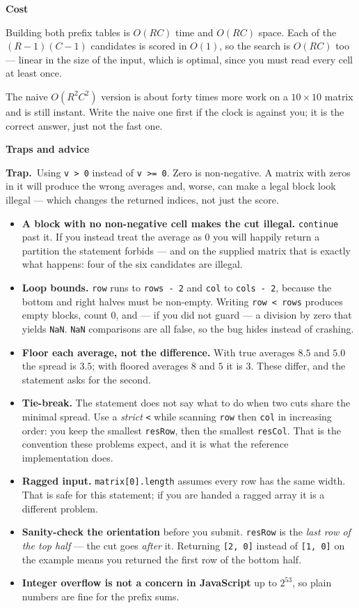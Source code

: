\documentclass[11pt,a4paper]{article}
\newcommand{\blk}[1]{\par\smallskip\noindent\textbf{\color{accent}#1}\par\nopagebreak}
\newcommand{\trap}[1]{\par\smallskip\noindent\textbf{\color{bad}Trap.}\ #1\par}
\begin{document}
\blk{Cost}
Building both prefix tables is $O(RC)$ time and $O(RC)$ space. Each of the
$(R-1)(C-1)$ candidates is scored in $O(1)$, so the search is $O(RC)$ too ---
linear in the size of the input, which is optimal, since you must read every
cell at least once.

The naive $O(R^2C^2)$ version is about forty times more work on a
$10 \times 10$ matrix and is still instant. Write the naive one first if the
clock is against you; it is the correct answer, just not the fast one.

\blk{Traps and advice}
\trap{Using \texttt{v > 0} instead of \texttt{v >= 0}. Zero is non-negative. A
matrix with zeros in it will produce the wrong averages and, worse, can make a
legal block look illegal --- which changes the returned indices, not just the
score.}

\begin{itemize}
  \item \textbf{A block with no non-negative cell makes the cut illegal.}
        \texttt{continue} past it. If you instead treat the average as 0 you
        will happily return a partition the statement forbids --- and on the
        supplied matrix that is exactly what happens: four of the six candidates
        are illegal.
  \item \textbf{Loop bounds.} \texttt{row} runs to \texttt{rows - 2} and
        \texttt{col} to \texttt{cols - 2}, because the bottom and right halves
        must be non-empty. Writing \texttt{row < rows} produces empty blocks,
        count 0, and --- if you did not guard --- a division by zero that yields
        \texttt{NaN}. \texttt{NaN} comparisons are all false, so the bug hides
        instead of crashing.
  \item \textbf{Floor each average, not the difference.} With true averages
        $8.5$ and $5.0$ the spread is $3.5$; with floored averages $8$ and $5$
        it is $3$. These differ, and the statement asks for the second.
  \item \textbf{Tie-break.} The statement does not say what to do when two cuts
        share the minimal spread. Use a \emph{strict} \texttt{<} while scanning
        \texttt{row} then \texttt{col} in increasing order: you keep the
        smallest \texttt{resRow}, then the smallest \texttt{resCol}. That is the
        convention these problems expect, and it is what the reference
        implementation does.
  \item \textbf{Ragged input.} \texttt{matrix[0].length} assumes every row has
        the same width. That is safe for this statement; if you are handed a
        ragged array it is a different problem.
  \item \textbf{Sanity-check the orientation} before you submit. \texttt{resRow}
        is the \emph{last row of the top half} --- the cut goes
        \emph{after} it. Returning \texttt{[2, 0]} instead of \texttt{[1, 0]}
        on the example means you returned the first row of the bottom half.
  \item \textbf{Integer overflow is not a concern in JavaScript} up to $2^{53}$,
        so plain numbers are fine for the prefix sums.
\end{itemize}
\end{document}
